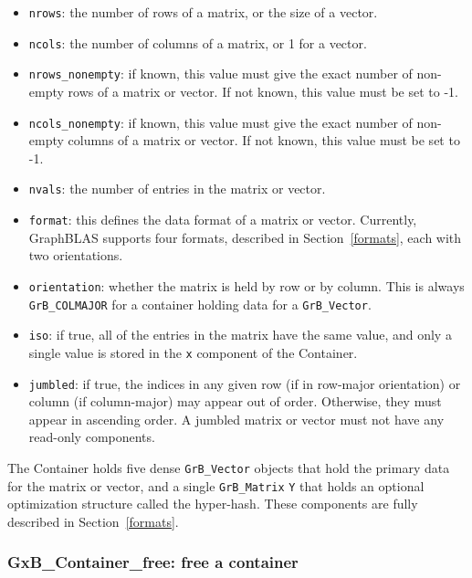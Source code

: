 \begin{itemize}
\item \verb'nrows': the number of rows of a matrix, or the size of a vector.
\item \verb'ncols': the number of columns of a matrix, or 1 for a vector. 
\item \verb'nrows_nonempty':  if known, this value must give the exact number
    of non-empty rows of a matrix or vector.  If not known, this value must be
    set to -1.
\item \verb'ncols_nonempty':  if known, this value must give the exact number
    of non-empty columns of a matrix or vector.  If not known, this value must be
    set to -1.
\item \verb'nvals': the number of entries in the matrix or vector.
\item \verb'format': this defines the data format of a matrix or vector.
    Currently, GraphBLAS supports four formats, described in
    Section~\ref{formats}, each with two orientations.
\item \verb'orientation':  whether the matrix is held by row or by column.
    This is always \verb'GrB_COLMAJOR' for a container holding data for a
    \verb'GrB_Vector'.
\item \verb'iso': if true, all of the entries in the matrix have the same
    value, and only a single value is stored in the \verb'x' component of
    the Container.
\item \verb'jumbled': if true, the indices in any given row (if in row-major
    orientation) or column (if column-major) may appear out of order.
    Otherwise, they must appear in ascending order.
    A jumbled matrix or vector must not have any read-only components. 
\end{itemize}

The Container holds five dense \verb'GrB_Vector' objects that hold
the primary data for the matrix or vector, and a single \verb'GrB_Matrix'
\verb'Y' that holds an optional optimization structure called the hyper-hash.
These components are fully described in Section~\ref{formats}.

\newpage
\subsubsection{{\sf GxB\_Container\_free:} free a container}
\label{container_free}

